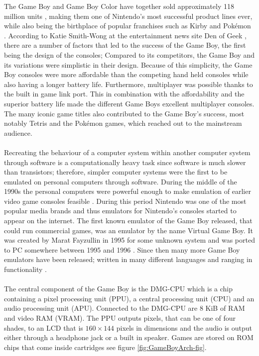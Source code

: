 The Game Boy and Game Boy Color have together sold approximately 118 million units \cite{GBSales}, making them one of Nintendo's most successful product lines ever, while also being the birthplace of popular franchises such as Kirby and Pokémon \cite{gameboytimeline2}. According to Katie Smith-Wong at the entertainment news site Den of Geek \cite{gameboylook}, there are a number of factors that led to the success of the Game Boy, the first being the design of the consoles; Compared to its competitors, the Game Boy and its variations were simplistic in their design. Because of this simplicity, the Game Boy consoles were more affordable than the competing hand held consoles while also having a longer battery life. Furthermore, multiplayer was possible thanks to the built in game link port. This in combination with the affordability and the superior battery life made the different Game Boys excellent multiplayer consoles. The many iconic game titles also contributed to the Game Boy's success, most notably Tetris and the Pokémon games, which reached out to the mainstream audience.\\
\\
Recreating the behaviour of a computer system within another computer system through software is a computationally heavy task since software is much slower than transistors; therefore, simpler computer systems were the first to be emulated on personal computers through software. During the middle of the 1990s the personal computers were powerful enough to make emulation of earlier video game consoles feasible \cite{emunation-history}. During this period Nintendo was one of the most popular media brands \cite{ask-wonder-nintendo} and thus emulators for Nintendo's consoles started to appear on the internet. The first known emulator of the Game Boy released, that could run commercial games, was an emulator by the name Virtual Game Boy. It was created by Marat Fayzullin in 1995 for some unknown system and was ported to PC somewhere between 1995 and 1996 \cite{gameboyemulationhistory}. Since then many more Game Boy emulators have been released; written in many different languages and ranging in functionality \cite{gameboyemulators}.\\
\\
The central component of the Game Boy is the DMG-CPU which is a chip containing a pixel processing unit (PPU), a central processing unit (CPU) and an audio processing unit (APU). Connected to the DMG-CPU are 8 KiB of RAM and video RAM (VRAM). The PPU outputs pixels, that can be one of four shades, to an LCD that is $160 \times 144$ pixels in dimensions and the audio is output either through a headphone jack or a built in speaker. Games are stored on ROM chips that come inside cartridges see figure \ref{fig:GameBoyArch-fig}.

